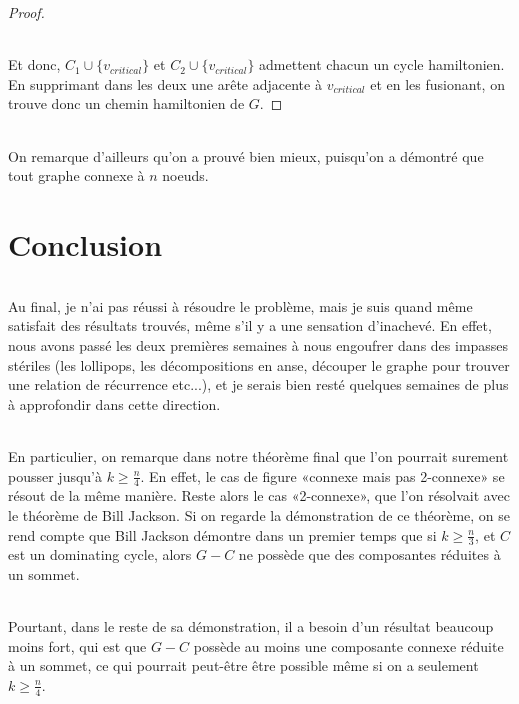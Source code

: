 \documentclass[a4paper]{article}
\theoremstyle{definition}
\theoremstyle{remark}
\begin{document}
\begin{proof}
\paragraph{}
Et donc, $C_{1} \cup \{v_{critical}\}$ et $C_{2} \cup \{v_{critical}\}$ 
admettent chacun un cycle hamiltonien. En supprimant dans les deux une
arête adjacente à $v_{critical}$ et en les fusionant, on trouve donc un 
chemin hamiltonien de $G$.
\end{proof}

\paragraph{}
On remarque d'ailleurs qu'on a prouvé bien mieux, puisqu'on a démontré que tout graphe connexe à $n$ noeuds. 

\part{Conclusion}
\paragraph{}
Au final, je n'ai pas réussi à résoudre le problème, mais je suis quand même satisfait des résultats trouvés, même s'il y a une sensation 
d'inachevé. En effet, nous avons passé les deux premières semaines à 
nous engoufrer dans des impasses stériles (les lollipops, les 
décompositions en anse, découper le graphe pour trouver une relation de récurrence etc...), et je serais bien resté quelques semaines de plus à 
approfondir dans cette direction.


\paragraph{}
En particulier, on remarque dans notre théorème final que l'on pourrait 
surement pousser jusqu'à $k \geq \frac{n}{4}$. En effet, le cas de figure
 «connexe mais pas 2-connexe» se résout de la même manière. Reste alors 
le cas «2-connexe», que l'on résolvait avec le théorème de Bill Jackson.
Si on regarde la démonstration de ce théorème, on se rend compte que 
Bill Jackson démontre dans un premier temps que si $k \geq \frac{n}{3}$, et $C$ est un dominating cycle, alors $G-C$ ne possède que des composantes réduites à un sommet. 

\paragraph{}
Pourtant, dans le reste de sa démonstration, il a besoin d'un résultat beaucoup moins fort, qui est
que $G-C$ possède au moins une composante connexe réduite à un sommet, ce
qui pourrait peut-être être possible même si on a seulement $k \geq \frac{n}{4}$.
\end{document}
